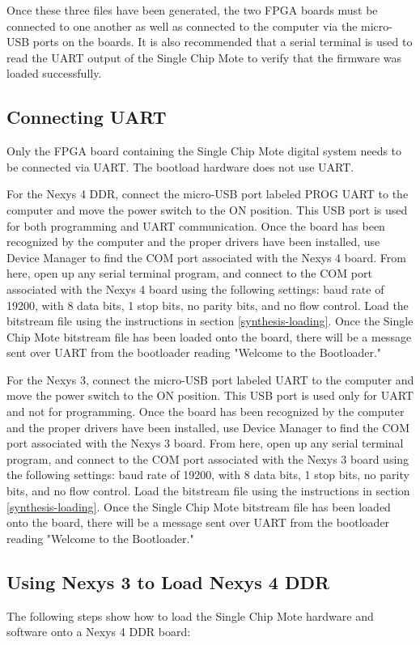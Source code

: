 Once these three files have been generated, the two FPGA boards must be connected to one another as well as connected to the computer via the micro-USB ports on the boards. It is also recommended that a serial terminal is used to read the UART output of the Single Chip Mote to verify that the firmware was loaded successfully.

\subsection{Connecting UART} \label{uart}
Only the FPGA board containing the Single Chip Mote digital system needs to be connected via UART. The bootload hardware does not use UART.

For the Nexys 4 DDR, connect the micro-USB port labeled PROG UART to the computer and move the power switch to the ON position. This USB port is used for both programming and UART communication. Once the board has been recognized by the computer and the proper drivers have been installed, use Device Manager to find the COM port associated with the Nexys 4 board. From here, open up any serial terminal program, and connect to the COM port associated with the Nexys 4 board using the following settings: baud rate of 19200, with 8 data bits, 1 stop bits, no parity bits, and no flow control. Load the bitstream file using the instructions in section \ref{synthesis-loading}. Once the Single Chip Mote bitstream file has been loaded onto the board, there will be a message sent over UART from the bootloader reading "Welcome to the Bootloader."

For the Nexys 3, connect the micro-USB port labeled UART to the computer and move the power switch to the ON position. This USB port is used only for UART and not for programming. Once the board has been recognized by the computer and the proper drivers have been installed, use Device Manager to find the COM port associated with the Nexys 3 board. From here, open up any serial terminal program, and connect to the COM port associated with the Nexys 3 board using the following settings: baud rate of 19200, with 8 data bits, 1 stop bits, no parity bits, and no flow control. Load the bitstream file using the instructions in section \ref{synthesis-loading}. Once the Single Chip Mote bitstream file has been loaded onto the board, there will be a message sent over UART from the bootloader reading "Welcome to the Bootloader."

\subsection{Using Nexys 3 to Load Nexys 4 DDR}
The following steps show how to load the Single Chip Mote hardware and software onto a Nexys 4 DDR board:

